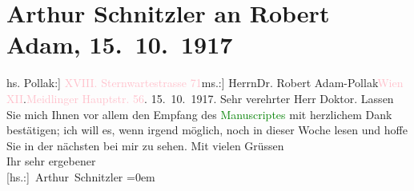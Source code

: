 

               \section[Arthur Schnitzler an Robert Adam, 15. 10. 1917]{ Arthur Schnitzler an Robert Adam, 15. 10. 1917}\nopagebreak{}\rehead{ }\normalsize\beginnumbering{} \toendnotes[C]{\smallbreak\pagebreak[2]} 
\toendnotes[C]{\smallbreak}\pstart{}{\pb}{[}hs. Pollak:{]} \textcolor{pink}{XVIII. Sternwartestrasse 71}{}\ledrightnote{\textcolor{pink}{Sternwartestraße}}\pend{}{\bigskip}\pstart{}{[}ms.:{]} Herrn\pend{}\pstart{}Dr. Robert Adam-\pend{}\pstart{}Pollak\pend{}\pstart{}\textcolor{pink}{Wien XII}{}\ledrightnote{\textcolor{pink}{XII., Meidling}}.\pend{}\pstart{}\textcolor{pink}{Meidlinger Hauptstr. 56}{}\ledrightnote{\textcolor{pink}{Meidlinger Hauptstraße}}.\pend{}{\bigskip}\pstart
           \raggedleft{}{\pb}15. 10. 1917.\pend
           \pstart{}Sehr verehrter Herr Doktor.\pend\pstart
           Lassen Sie mich Ihnen vor allem den Empfang des \textcolor{green}{Manuscriptes}{} mit herzlichem Dank bestätigen; ich will
                    es, wenn irgend möglich, noch in dieser Woche lesen und hoffe Sie in der
                    nächsten bei mir zu sehen.\pend
           \pstart
           Mit vielen Grüssen{\\[\baselineskip]}Ihr sehr ergebener{\\[\baselineskip]}\spacefill\mbox{{[}hs.:{]} Arthur Schnitzler}\pend
           \leftskip=0em{}\endnumbering{}  
      
